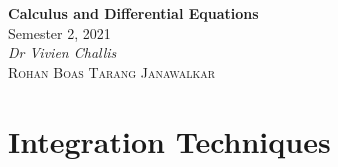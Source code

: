 \documentclass{article}
\date{}
\newcommand{\unitName}{Calculus and Differential Equations}
\newcommand{\unitTime}{Semester 2, 2021}
\newcommand{\unitCoordinator}{Dr Vivien Challis}
\newcommand{\documentAuthors}{\textsc{Rohan Boas} \quad\quad \textsc{Tarang Janawalkar}}
\begin{document}
%
\begin{titlepage}
    \vspace*{\fill}
    \begin{center}
        \LARGE{\textbf{\unitName}} \\[0.1in]
        \normalsize{\unitTime} \\[0.2in]
        \normalsize\textit{\unitCoordinator} \\[0.2in]
        \documentAuthors
    \end{center}
    \vspace*{\fill}
    \doclicenseThis
    \thispagestyle{empty}
\end{titlepage}
%
\tableofcontents
\newpage
%
\section{Integration Techniques}
\end{document}
